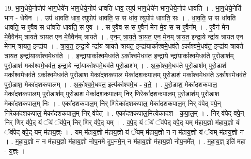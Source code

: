 \documentclass[17pt]{extarticle}
\begin{document}
19. भा॒ग॒धेये॒नोपोप॑ भाग॒धेये॑न भाग॒धेये॒नोप॑ धावति धाव॒ त्युप॑ भाग॒धेये॑न भाग॒धेये॒नोप॑ धावति । . भा॒ग॒धेये॒नेति॑ भाग - धेये॑न । . उप॑ धावति धाव॒ त्युपोप॑ धावति॒ स स धा॑व॒ त्युपोप॑ धावति॒ सः । . धा॒व॒ति॒ स स धा॑वति धावति॒ स ए॒वैव स धा॑वति धावति॒ स ए॒व । . स ए॒वैव स स ए॒वैन॑ मेन मे॒व स स ए॒वैन᳚म् । . ए॒वैन॑ मेन मे॒वैवैन॑म् त्रायते त्रायत एन मे॒वैवैन॑म् त्रायते । . ए॒न॒म् त्रा॒य॒ते॒ त्रा॒य॒त॒ ए॒न॒ मे॒न॒म् त्रा॒य॒त॒ इन्द्रा॒ये न्द्रा॑य त्रायत एन मेनम् त्रायत॒ इन्द्रा॑य । . त्रा॒य॒त॒ इन्द्रा॒ये न्द्रा॑य त्रायते त्रायत॒ इन्द्रा॑यार्काश्वमे॒धव॑ते ऽर्काश्वमे॒धव॑त॒ इन्द्रा॑य त्रायते त्रायत॒ इन्द्रा॑यार्काश्वमे॒धव॑ते । . इन्द्रा॑यार्काश्वमे॒धव॑ते ऽर्काश्वमे॒धव॑त॒ इन्द्रा॒ये न्द्रा॑यार्काश्वमे॒धव॑ते पुरो॒डाश॑म् पुरो॒डाश॑ मर्काश्वमे॒धव॑त॒ इन्द्रा॒ये न्द्रा॑यार्काश्वमे॒धव॑ते पुरो॒डाश᳚म् । . अ॒र्का॒श्व॒मे॒धव॑ते पुरो॒डाश॑म् पुरो॒डाश॑ मर्काश्वमे॒धव॑ते ऽर्काश्वमे॒धव॑ते पुरो॒डाश॒ मेका॑दशकपाल॒ मेका॑दशकपालम् पुरो॒डाश॑ मर्काश्वमे॒धव॑ते ऽर्काश्वमे॒धव॑ते पुरो॒डाश॒ मेका॑दशकपालम् । . अ॒र्का॒श्व॒मे॒धव॑त॒ इत्य॑र्काश्वमे॒ध - व॒ते॒ । . पु॒रो॒डाश॒ मेका॑दशकपाल॒ मेका॑दशकपालम् पुरो॒डाश॑म् पुरो॒डाश॒ मेका॑दशकपाल॒म् निर् णिरेका॑दशकपालम् पुरो॒डाश॑म् पुरो॒डाश॒ मेका॑दशकपाल॒म् निः । . एका॑दशकपाल॒म् निर् णिरेका॑दशकपाल॒ मेका॑दशकपाल॒म् निर् व॑पेद् वपे॒न् निरेका॑दशकपाल॒ मेका॑दशकपाल॒म् निर् व॑पेत् । . एका॑दशकपाल॒मित्येका॑दश - क॒पा॒ल॒म् । . निर् व॑पेद् वपे॒न् निर् णिर् व॑पे॒द् यं ॅयं ॅव॑पे॒न् निर् णिर् व॑पे॒द् यम् । . व॒पे॒द् यं ॅयं ॅव॑पेद् वपे॒द् यम् म॑हाय॒ज्ञो म॑हाय॒ज्ञो यं ॅव॑पेद् वपे॒द् यम् म॑हाय॒ज्ञ्ः । . यम् म॑हाय॒ज्ञो म॑हाय॒ज्ञो यं ॅयम् म॑हाय॒ज्ञो न न म॑हाय॒ज्ञो यं ॅयम् म॑हाय॒ज्ञो न । . म॒हा॒य॒ज्ञो न न म॑हाय॒ज्ञो म॑हाय॒ज्ञो नोप॒नमे॑ दुप॒नमे॒न् न म॑हाय॒ज्ञो म॑हाय॒ज्ञो नोप॒नमे᳚त् । . म॒हा॒य॒ज्ञ् इति॑ महा - य॒ज्ञ्ः । \newline
\end{document}
